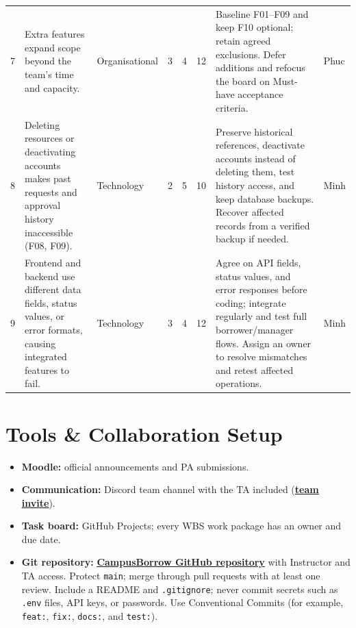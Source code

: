 \documentclass[11pt]{article}
\begin{document}
\begin{longtable}{@{}L{0.55cm}L{2.8cm}L{2.0cm}L{0.45cm}L{0.45cm}L{0.65cm}L{6.4cm}L{1.4cm}@{}}
7 & Extra features expand scope beyond the team's time and capacity. & Organi\-sational & 3 & 4 & 12 & Baseline F01--F09 and keep F10 optional; retain agreed exclusions. Defer additions and refocus the board on Must-have acceptance criteria. & Phuc \\
8 & Deleting resources or deactivating accounts makes past requests and approval history inaccessible (F08, F09). & Technology & 2 & 5 & 10 & Preserve historical references, deactivate accounts instead of deleting them, test history access, and keep database backups. Recover affected records from a verified backup if needed. & Minh \\
9 & Frontend and backend use different data fields, status values, or error formats, causing integrated features to fail. & Technology & 3 & 4 & 12 & Agree on API fields, status values, and error responses before coding; integrate regularly and test full borrower/manager flows. Assign an owner to resolve mismatches and retest affected operations. & Minh \\
\bottomrule
\end{longtable}
\normalsize

\section{Tools \& Collaboration Setup}
\begin{itemize}
  \item \textbf{Moodle:} official announcements and PA submissions.
  \item \textbf{Communication:} Discord team channel with the TA included (\href{https://discord.gg/QzNuBmzjH}{\underline{\textbf{team invite}}}).
  \item \textbf{Task board:} GitHub Projects; every WBS work package has an owner and due date.
  \item \textbf{Git repository:} \href{https://github.com/JuliaTrang/T09-CampusBorrow.git}{\underline{\textbf{CampusBorrow GitHub repository}}} with Instructor and TA access. Protect \texttt{main}; merge through pull requests with at least one review. Include a README and \texttt{.gitignore}; never commit secrets such as \texttt{.env} files, API keys, or passwords. Use Conventional Commits (for example, \texttt{feat:}, \texttt{fix:}, \texttt{docs:}, and \texttt{test:}).
\end{itemize}
\end{document}
